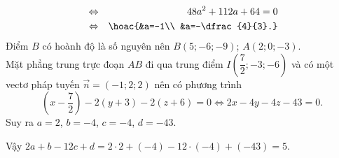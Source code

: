 \begin{ex}
{\begin{itemize}
\begin{eqnarray*}
				\\
				&\Leftrightarrow& 48a^2+112a+64=0
				\\
				&\Leftrightarrow&\hoac{&a=-1\\ &a=-\dfrac{4}{3}.}			
			\end{eqnarray*}
			Điểm $B$ có hoành độ là số nguyên nên $B(5;-6;-9)$; $A(2; 0;-3)$.\\
			Mặt phẳng trung trực đoạn $AB$ đi qua trung điểm $I\left(\dfrac{7}{2};-3;-6\right)$ và có một vectơ pháp tuyến $\vec{n}=(-1; 2; 2)$ nên có phương trình \[\left(x-\dfrac{7}{2}\right)-2(y+3)-2(z+6)=0\Leftrightarrow 2x-4y-4z-43=0.\]
			Suy ra $a=2$, $b=-4$, $c=-4$, $d=-43$.
		\end{itemize}
		Vậy $2a+b-12c+d=2\cdot 2+(-4)-12\cdot (-4)+(-43)=5$.
	}
\end{ex}

